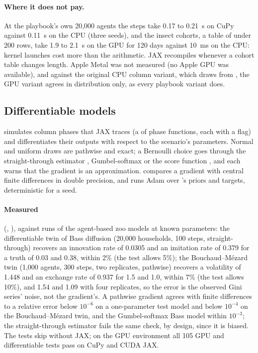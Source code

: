 \paragraph{Where it does not pay.} At the playbook's own 20,000 agents the steps take 0.17
to 0.21~s on CuPy against 0.11~s on the CPU (three seeds), and the insect cohorts, a table of
under 200 rows, take 1.9 to 2.1~s on the GPU for 120 days against 10~ms on the CPU: kernel
launches cost more than the arithmetic. JAX recompiles whenever a cohort table changes
length. Apple Metal was not measured (no Apple GPU was available), and against the original
CPU column variant, which draws from , the GPU variant agrees in distribution
only, as every playbook variant does.

\subsection{Differentiable models}
\label{app:diff}

 simulates column phases that JAX traces (a  of phase
functions, each with a  flag) and differentiates their outputs with
respect to the scenario's parameters. Normal and uniform draws are pathwise and exact; a Bernoulli choice
goes through the straight-through estimator \citep{bengio2013estimating}, Gumbel-softmax
\citep{jang2017categorical, maddison2017concrete} or the score function
\citep{williams1992simple}, and each warns that the gradient is an approximation.
 compares a gradient with central finite differences in double
precision, and  runs Adam \citep{kingma2015adam} over
's priors and targets, deterministic for a seed.

\paragraph{Measured} (, ), against runs of the
agent-based zoo models at known parameters: the differentiable twin of Bass diffusion (20,000
households, 100 steps, straight-through) recovers an innovation rate of 0.0305 and an
imitation rate of 0.379 for a truth of 0.03 and 0.38, within 2\% (the test allows 5\%); the
Bouchaud--Mézard twin (1,000 agents, 300 steps, two replicates, pathwise) recovers a
volatility of 1.448 and an exchange rate of 0.937 for 1.5 and 1.0, within 7\% (the test allows
10\%), and 1.54 and 1.09 with four replicates, so the error is the observed Gini series'
noise, not the gradient's. A pathwise gradient agrees with finite differences to a relative error below $10^{-6}$ on a
one-parameter test model and below $10^{-4}$ on the Bouchaud--Mézard twin, and the
Gumbel-softmax Bass model within $10^{-3}$; the straight-through
estimator fails the same check, by design, since it is biased. The tests skip without JAX;
on the GPU environment all 105 GPU and differentiable tests pass on CuPy and CUDA JAX.

